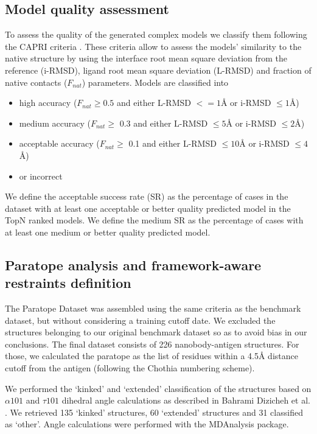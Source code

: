\documentclass[12pt]{article}
\begin{document}
\subsection{Model quality assessment}

To assess the quality of the generated complex models we classify them following the CAPRI criteria \cite{janin2003capri, mendez2003assessment}. These criteria allow to assess the models' similarity to the native structure by using the interface root mean square deviation from the reference (i-RMSD), ligand root mean square deviation (L-RMSD) and fraction of native contacts ($F_{nat}$) parameters. Models are classified into 
\begin{itemize}
	\item high accuracy ($F_{nat} \geq 0.5$ and either L-RMSD $<= 1$Å or i-RMSD $\leq 1$Å)
	\item  medium accuracy ($F_{nat} \geq $ 0.3 and either L-RMSD $\leq 5$Å or i-RMSD $\leq 2$Å)
	\item acceptable accuracy ($F_{nat} \geq $ 0.1 and either L-RMSD $\leq 10$Å or i-RMSD $\leq 4$Å)
	\item or incorrect
\end{itemize}

We define the acceptable success rate (SR) as the percentage of cases in the dataset with at least one acceptable or better quality predicted model in the TopN ranked models. We define the medium SR as the percentage of cases with at least one medium or better quality predicted model.

\subsection{Paratope analysis and framework-aware restraints definition}\label{methods:para}

The Paratope Dataset was assembled using the same criteria as the benchmark dataset, but without considering a training cutoff date. We excluded the structures belonging to our original benchmark dataset so as to avoid bias in our conclusions. The final dataset consists of 226 nanobody-antigen structures. For those, we calculated the paratope as the list of residues within a 4.5Å distance cutoff from the antigen (following the Chothia numbering scheme).

We performed the ‘kinked’ and ‘extended’ classification of the structures based on $\alpha101$ and $\tau101$ dihedral angle calculations as described in Bahrami Dizicheh et al. \cite{bahrami2023vhh}. We retrieved 135 ‘kinked’ structures, 60 ‘extended’ structures and 31 classified as ‘other’. Angle calculations were performed with the MDAnalysis package.
\end{document}
